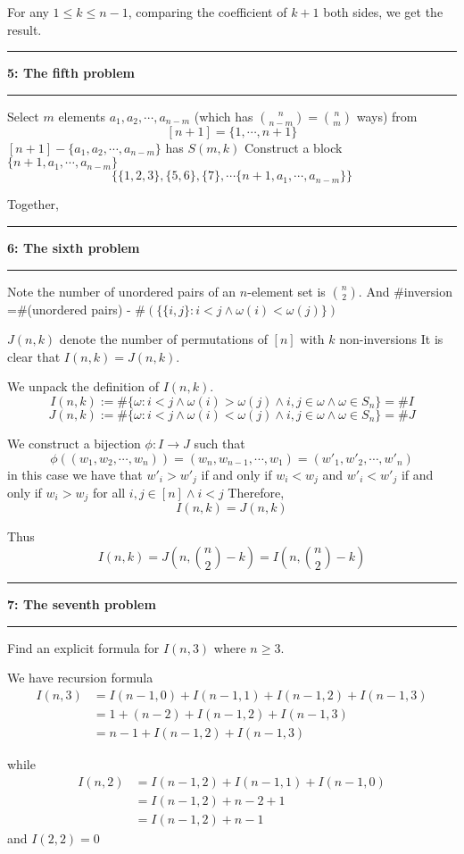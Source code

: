 \documentclass[11pt]{article}
\newcommand\question[2]{\vspace{.25in}\hrule\textbf{#1: #2}\vspace{.5em}\hrule\vspace{.10in}}
\begin{document}
For any $1\le k\le n - 1$, comparing the coefficient of $k + 1$ both sides, we get the result.

\question{5}{The fifth problem}
Select $m$ elements $a_1, a_2, \cdots, a_{n - m}$ (which has $\binom{n}{n - m} = \binom{n}{m}$ ways) from 
\[[n + 1] = \{1,\cdots, n + 1\}\]
$[n + 1] - \{a_1, a_2, \cdots, a_{n - m}\}$ has $S(m, k)$
Construct a block $\{n+1, a_1, \cdots, a_{n - m}\}$
\[\{\{1,2,3\},\{5,6\},\{7\},\cdots\{n+1, a_1, \cdots, a_{n - m}\}\}\]

Together, 

\question{6}{The sixth problem}
Note the number of unordered pairs of an $n$-element set is $\binom{n}{2}$.
And \#inversion =\#(unordered pairs) - $\#(\{\{i, j\} : i < j \land \omega(i) < \omega(j)\})$

$J(n,k)$ denote the number of permutations of $[n]$ with $k$ non-inversions
It is clear that $I(n, k) = J(n, k)$.

We unpack the definition of $I(n, k)$.
\[I(n, k) := \#\{\omega : i < j \land \omega(i) > \omega(j) \land i, j \in \omega \land \omega \in S_n\} = \#I\]
\[J(n, k) := \#\{\omega : i < j \land \omega(i) < \omega(j) \land i, j \in \omega \land \omega \in S_n\} = \#J\]
\pagebreak

We construct a bijection $\phi : I \to J$ such that
\[\phi((w_1, w_2, \cdots, w_n)) = (w_n, w_{n-1}, \cdots, w_1) = (w'_1, w'_2, \cdots, w'_n)\]
in this case we have that $w'_i > w'_j$ if and only if $w_i < w_j$ and $w'_i < w'_j$ if and only if $w_i > w_j$ for all $i, j \in [n]\land i < j$
Therefore, 
\[I(n,k) = J(n, k)\]

Thus
\[I(n, k) = J\left(n, \binom{n}{2} -k\right) = I\left(n, \binom{n}{2} -k\right)\]

\question{7}{The seventh problem}
Find an explicit formula for $I(n, 3)$ where $n \ge 3$.

We have recursion formula
\begin{align*}
    I(n, 3) &= I(n - 1, 0) + I(n - 1, 1) + I(n - 1, 2) + I(n - 1, 3) \\ 
            &= 1 + (n - 2) + I(n - 1, 2) + I(n - 1, 3) \\
            &= n - 1 + I(n - 1, 2) + I(n - 1, 3)
\end{align*}

while
\begin{align*}
    I(n, 2) &= I(n - 1, 2) + I(n - 1, 1) + I(n - 1, 0) \\ 
            &= I(n - 1, 2) + n - 2 + 1 \\
            &= I(n - 1, 2) + n - 1
\end{align*}
and $I(2, 2) = 0$
\end{document}
